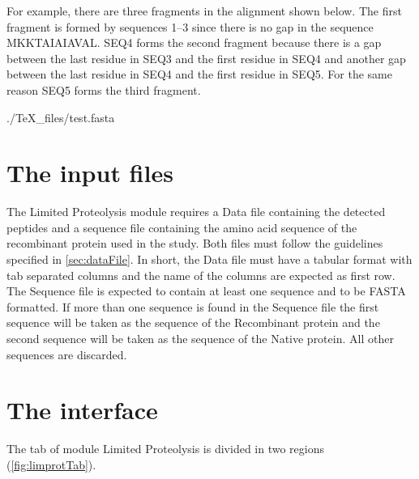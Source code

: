 For example, there are three fragments in the alignment shown below. The first fragment
is formed by sequences \numrange{1}{3} since there is no gap in the sequence MKKTAIAIAVAL.
SEQ\num{4} forms the second fragment because there is a gap between the last residue
in SEQ\num{3} and the first residue in SEQ\num{4} and another gap between the last
residue in SEQ\num{4} and the first residue in SEQ\num{5}. For the same reason
SEQ\num{5} forms the third fragment.

\begin{texshade}{./TeX_files/test.fasta}
    \hideconsensus
\end{texshade}

\section{The input files}

The Limited Proteolysis module requires a Data file containing the detected peptides
and a sequence file containing the amino acid sequence of the recombinant protein
used in the study. Both files must follow the guidelines specified in \autoref{sec:dataFile}.
In short, the Data file must have a tabular format with tab separated columns and
the name of the columns are expected as first row. The Sequence file is expected
to contain at least one sequence and to be FASTA formatted. If more than one sequence
is found in the Sequence file the first sequence will be taken as the sequence of
the Recombinant protein and the second sequence will be taken as the sequence of
the Native protein. All other sequences are discarded.

\section{The interface}

The tab of module Limited Proteolysis is divided in two regions (\autoref{fig:limprotTab}).

